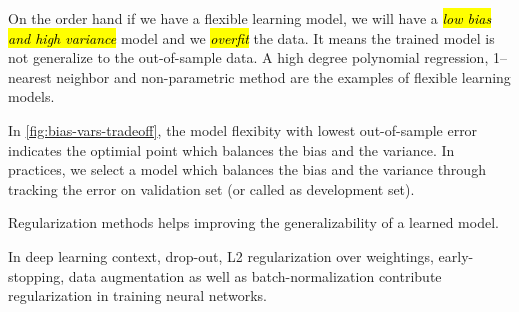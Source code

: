 \documentclass{kthreport}
\begin{document}
On the order hand if we have a flexible learning model,
we will have a \emph{\hl{low bias and high variance}} model and we \emph{\hl{overfit}} the data.
It means the trained model is not generalize to the out-of-sample data. A high
degree polynomial regression, 1--nearest neighbor and non-parametric method are the
examples of flexible learning models.

In \cref{fig:bias-vars-tradeoff}, the model flexibity with lowest out-of-sample
error indicates the optimial point which balances the bias and the variance.
In practices, we select a model which balances the bias and the variance through
tracking the error on validation set (or called as development set).

Regularization methods helps improving the generalizability of a learned model.

In deep learning context, drop-out, L2 regularization over weightings, early-stopping,
data augmentation as well as batch-normalization
contribute regularization in training neural networks. \cite{luo2018-bn-regularization}
\end{document}
